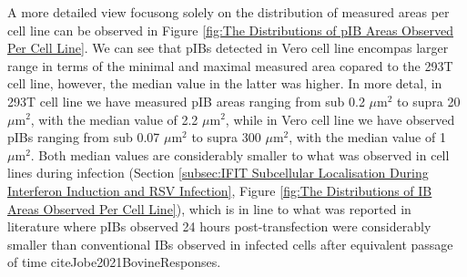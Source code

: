 A more detailed view focusong solely on the distribution of measured areas per cell line can be observed in Figure \ref{fig:The Distributions of pIB Areas Observed Per Cell Line}. We can see that pIBs detected in Vero cell line encompas larger range in terms of the minimal and maximal measured area copared to the 293T cell line, however, the median value in the latter was higher. In more detal, in 293T cell line we have measured pIB areas ranging from sub 0.2 \(\mu \mbox{m}^2\) to supra 20 \(\mu \mbox{m}^2\), with the median value of 2.2 \(\mu \mbox{m}^2\), while in Vero cell line we have observed pIBs ranging from sub 0.07 \(\mu \mbox{m}^2\) to supra 300 \(\mu \mbox{m}^2\), with the median value of 1 \(\mu \mbox{m}^2\). Both median values are considerably smaller to what was observed in cell lines during infection (Section \ref{subsec:IFIT Subcellular Localisation During Interferon Induction and RSV Infection}, Figure \ref{fig:The Distributions of IB Areas Observed Per Cell Line}), which is in line to what was reported in literature where pIBs observed 24 hours post-transfection were considerably smaller than conventional IBs observed in infected cells after equivalent passage of time cite{Jobe2021BovineResponses}.

